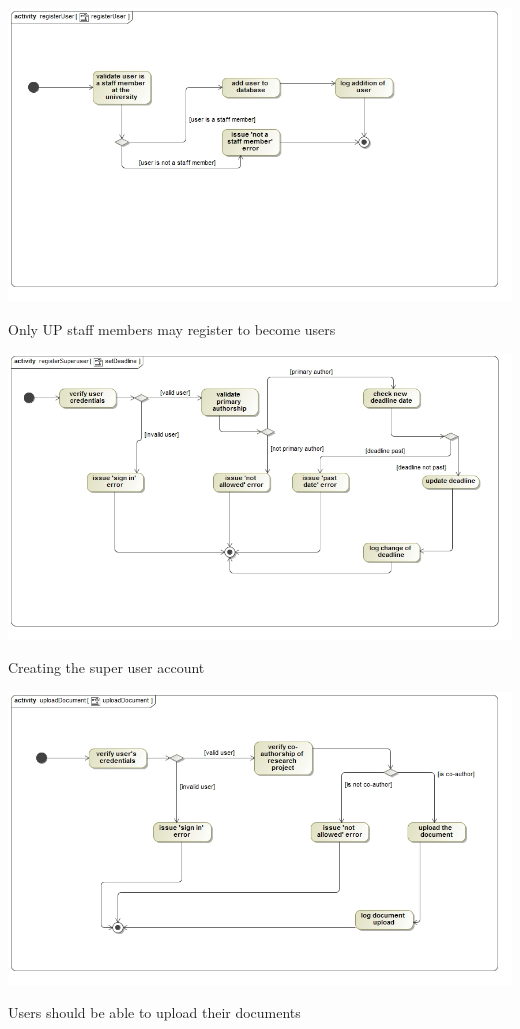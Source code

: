 \documentclass[a4paper,12pt]{report}
\begin{document}
\begin{flushleft}
	\includegraphics[scale=0.5]{./images/act__registerUser__registerUser.jpg} 
	\begin{center}
		Only UP staff members may register to become users
	\end{center}

	\includegraphics[scale=0.5]{./images/act__registerSuperuser__setDeadline.jpg} 
	\begin{center}
		Creating the super user account
	\end{center}
\end{flushleft}

\newpage

\begin{flushleft}
	\includegraphics[scale=0.5]{./images/act__uploadDocument.jpg} 
	\begin{center}
		Users should be able to upload their documents
	\end{center}
\end{flushleft}
\end{document}
